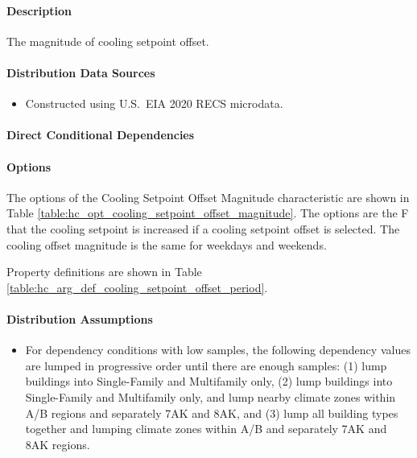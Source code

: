 \paragraph{Description}
% 
The magnitude of cooling setpoint offset.

\paragraph{Distribution Data Sources}
% 
\begin{itemize}
    \item Constructed using U.S.~EIA 2020 RECS microdata.
\end{itemize}

\paragraph{Direct Conditional Dependencies}


\paragraph{Options}
The options of the Cooling Setpoint Offset Magnitude characteristic are shown in Table \ref{table:hc_opt_cooling_setpoint_offset_magnitude}. The options are the \degree F that the cooling setpoint is increased if a cooling setpoint offset is selected. The cooling offset magnitude is the same for weekdays and weekends.



Property definitions are shown in Table \ref{table:hc_arg_def_cooling_setpoint_offset_period}.



\paragraph{Distribution Assumptions}
% 
\begin{itemize}
    \item For dependency conditions with low samples, the following dependency values are lumped in progressive order until there are enough samples: (1) lump buildings into Single-Family and Multifamily only, (2) lump buildings into Single-Family and Multifamily only, and lump nearby climate zones within A/B regions and separately 7AK and 8AK, and (3) lump all building types together and lumping climate zones within A/B and separately 7AK and 8AK regions.
\end{itemize}

